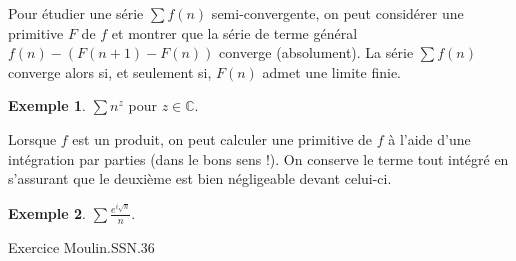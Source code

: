 \documentclass[french]{article}
\newcommand{\C}{\mathbb{C}}
\theoremstyle{plain}
\theoremstyle{definition}
\newtheorem*{ex}{Exemple}
\theoremstyle{remark}
\begin{document}
Pour étudier une série $\displaystyle\sum f(n)$ semi-convergente, on peut considérer une primitive $F$ de $f$ et montrer que la série de terme général $f(n)-(F(n+1)-F(n))$ converge (absolument). La série $\displaystyle\sum f(n)$ converge alors si, et seulement si, $F(n)$ admet une limite finie.

\begin{ex}
	$\displaystyle\sum n^z$ pour $z\in\C$.
\end{ex}

Lorsque $f$ est un produit, on peut calculer une primitive de $f$ à l'aide d'une intégration par parties (dans le bons sens !). On conserve le terme tout intégré en s'assurant que le deuxième est bien négligeable devant celui-ci.

\begin{ex}
	$\displaystyle\sum\frac{e^{i\sqrt{n}}}{n}$.
\end{ex}

Exercice Moulin.SSN.36
\end{document}
